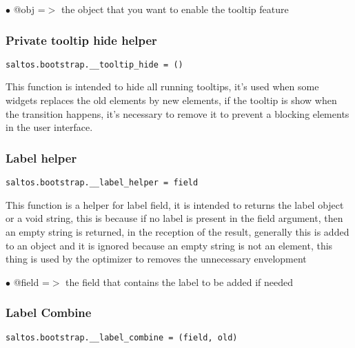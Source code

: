 \documentclass[a4paper]{article}
\begin{document}
\begin{compactitem}
\item[\color{myblue}$\bullet$] @obj =$>$ the object that you want to enable the tooltip feature
\end{compactitem}

\hypertarget{toc654}{}
\subsubsection{Private tooltip hide helper}

\begin{lstlisting}
saltos.bootstrap.__tooltip_hide = ()
\end{lstlisting}

This function is intended to hide all running tooltips, it's used when some widgets
replaces the old elements by new elements, if the tooltip is show when the transition
happens, it's necessary to remove it to prevent a blocking elements in the user
interface.

\hypertarget{toc655}{}
\subsubsection{Label helper}

\begin{lstlisting}
saltos.bootstrap.__label_helper = field
\end{lstlisting}

This function is a helper for label field, it is intended to returns the label object
or a void string, this is because if no label is present in the field argument, then
an empty string is returned, in the reception of the result, generally this is added
to an object and it is ignored because an empty string is not an element, this thing
is used by the optimizer to removes the unnecessary envelopment

\begin{compactitem}
\item[\color{myblue}$\bullet$] @field =$>$ the field that contains the label to be added if needed
\end{compactitem}

\hypertarget{toc656}{}
\subsubsection{Label Combine}

\begin{lstlisting}
saltos.bootstrap.__label_combine = (field, old)
\end{lstlisting}
\end{document}
